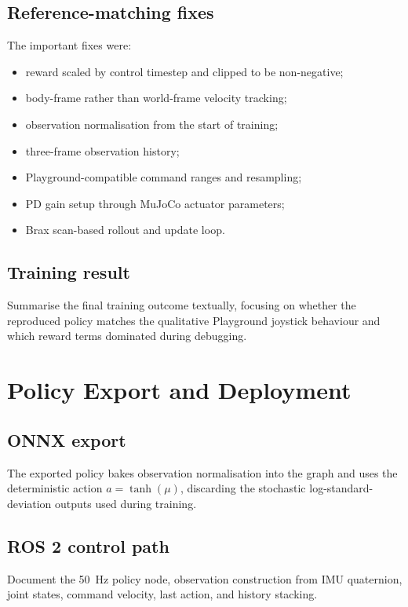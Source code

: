 \subsection{Reference-matching fixes}

The important fixes were:
\begin{itemize}
  \item reward scaled by control timestep and clipped to be non-negative;
  \item body-frame rather than world-frame velocity tracking;
  \item observation normalisation from the start of training;
  \item three-frame observation history;
  \item Playground-compatible command ranges and resampling;
  \item PD gain setup through MuJoCo actuator parameters;
  \item Brax scan-based rollout and update loop.
\end{itemize}

\subsection{Training result}

Summarise the final training outcome textually, focusing on whether the reproduced policy matches the qualitative Playground joystick behaviour and which reward terms dominated during debugging.

\section{Policy Export and Deployment}
\label{sec:deployment}

\subsection{ONNX export}

The exported policy bakes observation normalisation into the graph and uses the deterministic action $a=\tanh(\mu)$, discarding the stochastic log-standard-deviation outputs used during training.

\subsection{ROS 2 control path}

Document the 50~Hz policy node, observation construction from IMU quaternion, joint states, command velocity, last action, and history stacking.

